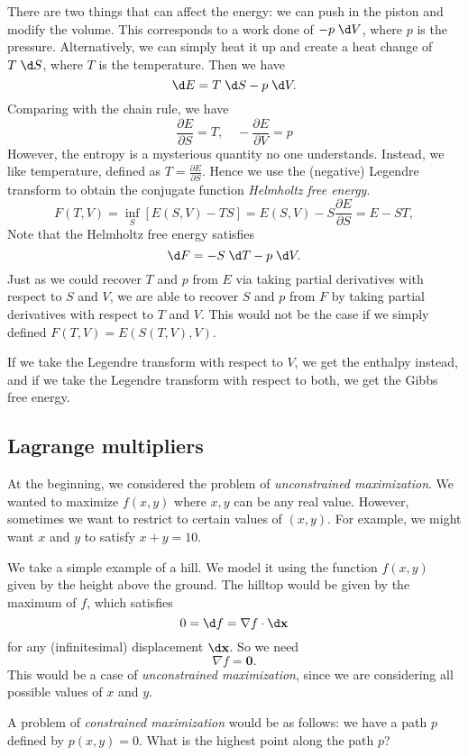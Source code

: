 \documentclass[a4paper]{article}
\begin{document}
There are two things that can affect the energy: we can push in the piston and modify the volume. This corresponds to a work done of $-p\;\d V$, where $p$ is the pressure. Alternatively, we can simply heat it up and create a heat change of $T\;\d S$, where $T$ is the temperature. Then we have
\[
  \d E = T\;\d S - p\;\d V.
\]
Comparing with the chain rule, we have
\[
  \frac{\partial E}{\partial S} = T,\quad -\frac{\partial E}{\partial V} = p
\]
However, the entropy is a mysterious quantity no one understands. Instead, we like temperature, defined as $T = \frac{\partial E}{\partial S}$. Hence we use the (negative) Legendre transform to obtain the conjugate function \emph{Helmholtz free energy}.
\[
  F(T, V) = \inf_S [E(S, V) - TS] = E(S, V) - S\frac{\partial E}{\partial S} = E - ST,
\]
Note that the Helmholtz free energy satisfies
\[
  \d F = - S \;\d T - p \;\d V.
\]
Just as we could recover $T$ and $p$ from $E$ via taking partial derivatives with respect to $S$ and $V$, we are able to recover $S$ and $p$ from $F$ by taking partial derivatives with respect to $T$ and $V$. This would not be the case if we simply defined $F(T, V) = E(S(T, V), V)$.

If we take the Legendre transform with respect to $V$, we get the enthalpy instead, and if we take the Legendre transform with respect to both, we get the Gibbs free energy.

\subsection{Lagrange multipliers}
At the beginning, we considered the problem of \emph{unconstrained maximization}. We wanted to maximize $f(x, y)$ where $x, y$ can be any real value. However, sometimes we want to restrict to certain values of $(x, y)$. For example, we might want $x$ and $y$ to satisfy $x + y = 10$.

We take a simple example of a hill. We model it using the function $f(x, y)$ given by the height above the ground. The hilltop would be given by the maximum of $f$, which satisfies
\[
  0 = \d f = \nabla f\cdot \d \mathbf{x}
\]
for any (infinitesimal) displacement $\d \mathbf{x}$. So we need
\[
  \nabla f = \mathbf{0}.
\]
This would be a case of \emph{unconstrained maximization}, since we are considering all possible values of $x$ and $y$.

A problem of \emph{constrained maximization} would be as follows: we have a path $p$ defined by $p(x, y) = 0$. What is the highest point along the path $p$?
\end{document}
